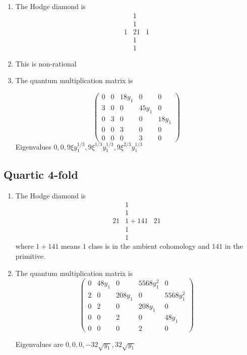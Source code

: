 \documentclass[11pt]{amsart}
\newcounter{num}[section] %
\begin{document}
\begin{enumerate}
    \item [1)] The Hodge diamond is
    \[
        \begin{array}{ccccc}
             &1&  \\
             &1&\\
             1&21&1\\
             &1&\\
             &1&
        \end{array}
    \]

    \item[2)] This is non-rational

    \item[3)] The quantum multiplication matrix is 



\[
\begin{pmatrix}
0 & 0 & 18 y_1 & 0 & 0 \\
3 & 0 & 0 & 45 y_1 & 0 \\
0 & 3 & 0 & 0 & 18 y_1 \\
0 & 0 & 3 & 0 & 0 \\
0 & 0 & 0 & 3 & 0
\end{pmatrix}
\]
Eigenvalues $0,0,9\xi y_1^{1/3}, 9 \xi^{1/3} y_1^{1/3},
 9\xi^{2/3} y_1^{1/3}$
 \end{enumerate}

\subsection{Quartic 4-fold}
\begin{enumerate}

\item[1)]The Hodge diamond is
\[
    \begin{array}{ccc}
         &1&  \\
         &1&\\
         21 &1+141 &21\\
         &1&\\
         &1&
    \end{array}
\]
where $1+141$ means $1$ class is in the ambient cohomology and $141$ in the primitive.
\item[2)] The quantum multiplication matrix is 
\[
\begin{pmatrix}
0 & 48 y_1 & 0 & 5568 y_1^2 & 0 \\
2 & 0 & 208 y_1 & 0 & 5568 y_1^2 \\
0 & 2 & 0 & 208 y_1 & 0 \\
0 & 0 & 2 & 0 & 48 y_1 \\
0 & 0 & 0 & 2 & 0
\end{pmatrix}
\]

Eigenvalues are $0,0,0,-32\sqrt{y_1},32\sqrt{y_1}$
\end{enumerate}
\end{document}
